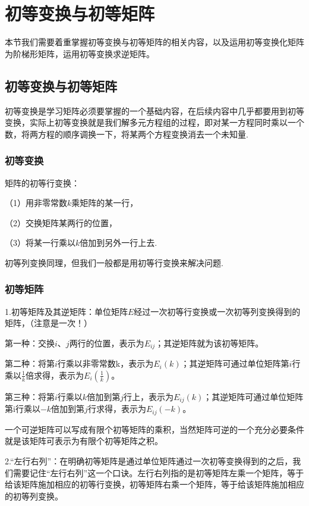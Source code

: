 \chapter{初等变换与初等矩阵}

本节我们需要着重掌握初等变换与初等矩阵的相关内容，以及运用初等变换化矩阵为阶梯形矩阵，运用初等变换求逆矩阵。

\section{初等变换与初等矩阵}
初等变换是学习矩阵必须要掌握的一个基础内容，在后续内容中几乎都要用到初等变换，实际上初等变换就是我们解多元方程组的过程，即对某一方程同时乘以一个数，将两方程的顺序调换一下，将某两个方程变换消去一个未知量.
\subsection{初等变换}

矩阵的初等行变换：

（1）用非零常数$k$乘矩阵的某一行，

（2）交换矩阵某两行的位置，

（3）将某一行乘以$k$倍加到另外一行上去.

初等列变换同理，但我们一般都是用初等行变换来解决问题.

\subsection{初等矩阵}

1.初等矩阵及其逆矩阵：单位矩阵$E$经过一次初等行变换或一次初等列变换得到的矩阵，（注意是一次！）

第一种：交换$i$、$j$两行的位置，表示为$E_{ij}$；其逆矩阵就为该初等矩阵。

第二种：将第$i$行乘以非零常数k，表示为$E_i(k)$；其逆矩阵可通过单位矩阵第$i$行乘以$
	\frac{1}{k}$倍求得，表示为$E_{i}(\frac{1}{k})$。

第三种：将第$i$行乘以$k$倍加到第$j$行上，表示为$E_{ij}(k)$；其逆矩阵可通过单位矩阵第i行乘以$-k$倍加到第$j$行求得，表示为$E_{ij}(-k)$。

\begin{remark}
	一个可逆矩阵可以写成有限个初等矩阵的乘积，当然矩阵可逆的一个充分必要条件就是该矩阵可表示为有限个初等矩阵之积。
\end{remark}

2.“左行右列”：在明确初等矩阵是通过单位矩阵通过一次初等变换得到的之后，我们需要记住“左行右列”这一个口诀。左行右列指的是初等矩阵左乘一个矩阵，等于给该矩阵施加相应的初等行变换，初等矩阵右乘一个矩阵，等于给该矩阵施加相应的初等列变换。

